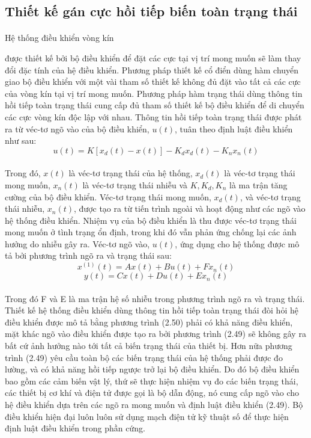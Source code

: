 \subsection{Thiết kế gán cực hồi tiếp biến toàn trạng thái} 
\paragraph{}Hệ thống điều khiển vòng kín

 được thiết kế bởi bộ điều khiển để đặt các cực tại vị trí mong muốn sẽ làm thay đổi đặc tính của hệ điều khiển. Phương pháp thiết kế cổ điển dùng hàm chuyển giao bộ điều khiển với một vài tham số thiết kế không đủ đặt vào tất cả các cực của vòng kín tại vị trí mong muốn. Phương pháp hàm trạng thái dùng thông tin hồi tiếp toàn trạng thái cung cấp đủ tham số thiết kế bộ điều khiển để di chuyển các cực vòng kín độc lập với nhau. Thông tin hồi tiếp toàn trạng thái được phát ra từ véc-tơ ngõ vào của bộ điều khiển, $u(t)$, tuân theo định luật điều khiển như sau: 
\begin{equation}
u(t) = K[x_{d}(t) - x(t)] - K_{d}x_{d}(t) - K_{n}x_{n}(t)
\end{equation}
\paragraph{}Trong đó, $x(t)$ là véc-tơ trạng thái của hệ thống, $x_{d}(t)$ là véc-tơ trạng thái mong muốn, $x_{n}(t)$ là véc-tơ trạng thái nhiễu và $K, K_{d}, K_{n}$ là ma trận tăng cường của bộ điều khiển. Véc-tơ trạng thái mong muốn, $x_{d}(t)$, và véc-tơ trạng thái nhiễu, $x_{n}(t)$, được tạo ra từ tiến trình ngoài và hoạt động như các ngõ vào hệ thống điều khiển. Nhiệm vụ của bộ điều khiển là thu được véc-tơ trạng thái mong muốn ở tình trạng ổn định, trong khi đó vẫn phản ứng chống lại các ảnh hưởng do nhiễu gây ra. Véc-tơ ngõ vào, $u(t)$, ứng dụng cho hệ thống được mô tả bởi phương trình ngõ ra và trạng thái sau: 
\begin{equation}
x^{(1)}(t) = Ax(t) + Bu(t) + Fx_{n}(t)
\end{equation}
\begin{equation}
y(t) = Cx(t) + Du(t) + Ex_{n}(t)
\end{equation}
\paragraph{}Trong đó F và E là ma trận hệ số nhiễu trong phương trình ngõ ra và trạng thái. Thiết kế hệ thống điều khiển dùng thông tin hồi tiếp toàn trạng thái đòi hỏi hệ điều khiển được mô tả bằng phương trình (2.50) phải có khả năng điều khiển, mặt khác ngõ vào điều khiển được tạo ra bởi phương trình (2.49) sẽ không gây ra bất cứ ảnh hưởng nào tới tất cả biến trạng thái của thiết bị. Hơn nữa phương trình (2.49) yêu cầu toàn bộ các biến trạng thái của hệ thống phải được đo lường, và có khả năng hồi tiếp ngược trở lại bộ điều khiển. Do đó bộ điều khiển bao gồm các cảm biến vật lý, thứ sẽ thực hiện nhiệm vụ đo các biến trạng thái, các thiết bị cơ khí và điện tử được gọi là bộ dẫn động, nó cung cấp ngõ vào cho hệ điều khiển dựa trên các ngõ ra mong muốn và định luật điều khiển (2.49). Bộ điều khiển hiện đại luôn luôn sử dụng mạch điện tử kỹ thuật số để thực hiện định luật điều khiển trong phần cứng. 
